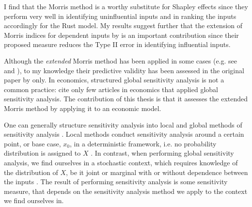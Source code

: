 I find that the Morris method is a worthy substitute for Shapley effects since they perform very well in identifying uninfluential inputs and in ranking the inputs accordingly for the Rust model. My results suggest further that the extension of Morris indices for dependent inputs by \citet{GM17} is an important contribution since their proposed measure reduces the Type II error in identifying influential inputs.

Although the \textit{extended} Morris method has been applied in some cases (e.g. see \citet{MMA18} and \citet{RZY19}), to my knowledge their predictive validity has been assessed in the original paper by \citet{GM17} only. In economics, structured global sensitivity analysis is not a common practice: \citet{HMSW19} cite only few articles in economics that applied global sensitivity analysis. The contribution of this thesis is that it assesses the extended Morris method by applying it to an economic model.



One can generally structure sensitivity analysis into local and global methods of sensitivity analysis \citep{BP16}. Local methods conduct sensitivity analysis around a certain point, or base case, $x_0$, in a deterministic framework, i.e. no probability distribution is assigned to $X$ \citep{BP16}. In contrast, when performing global sensitivity analysis, we find ourselves in a stochastic context, which requires knowledge of the distribution of $X$, be it joint or marginal with or without dependence between the inputs \citep{ST02}. The result of performing sensitivity analysis is some sensitivity measure, that depends on the sensitivity analysis method we apply to the context we find ourselves in.

